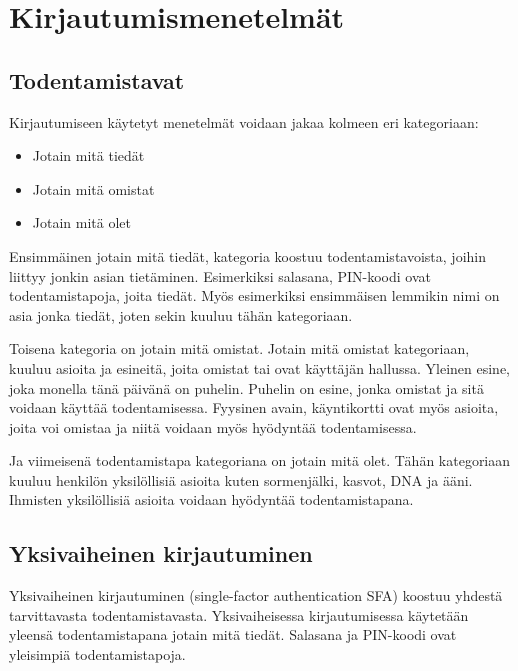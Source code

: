 \chapter{Kirjautumismenetelmät\label{kirjautumismenetelmät}}


\section{Todentamistavat}
Kirjautumiseen käytetyt menetelmät voidaan jakaa kolmeen eri kategoriaan:
\begin{itemize}
    \item Jotain mitä tiedät
    \item Jotain mitä omistat
    \item Jotain mitä olet
\end{itemize}

Ensimmäinen jotain mitä tiedät, kategoria koostuu todentamistavoista, joihin liittyy jonkin asian tietäminen. Esimerkiksi salasana, PIN-koodi ovat todentamistapoja, joita tiedät. Myös esimerkiksi ensimmäisen lemmikin nimi on asia jonka tiedät, joten sekin kuuluu tähän kategoriaan.

Toisena kategoria on jotain mitä omistat. Jotain mitä omistat kategoriaan, kuuluu asioita ja esineitä, joita omistat tai ovat käyttäjän hallussa. Yleinen esine, joka monella tänä päivänä on puhelin. Puhelin on esine, jonka omistat ja sitä voidaan käyttää todentamisessa. Fyysinen avain, käyntikortti ovat myös asioita, joita voi omistaa ja niitä voidaan myös hyödyntää todentamisessa.

Ja viimeisenä todentamistapa kategoriana on jotain mitä olet. Tähän kategoriaan kuuluu henkilön yksilöllisiä asioita kuten sormenjälki, kasvot, DNA ja ääni. Ihmisten yksilöllisiä asioita voidaan hyödyntää todentamistapana.



\section{Yksivaiheinen kirjautuminen}

Yksivaiheinen kirjautuminen (single-factor authentication SFA) koostuu yhdestä tarvittavasta todentamistavasta. Yksivaiheisessa kirjautumisessa käytetään yleensä todentamistapana jotain mitä tiedät. Salasana ja PIN-koodi ovat yleisimpiä todentamistapoja.

